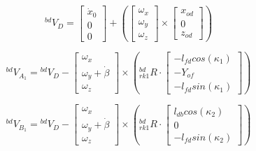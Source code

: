 \begin{equation}\label{traction_control:discussion:velocity-body}
	{}^{bd}V_{D} = \left[\begin{array}{c}
		\dot{x}_0 \\
		0 \\
		0
	\end{array}\right] + \left(\left[\begin{array}{c}
		\omega_{x} \\
		\omega_{y} \\
		\omega_{z}
	\end{array}\right] \times \left[\begin{array}{c}
	x_{od} \\
	0 \\
	z_{od}
	\end{array}\right]\right)
\end{equation}

\begin{equation}\label{traction_control:discussion:velocity-rocker-wheel}
	{}^{bd}V_{A_{1}} = {}^{bd}V_{D} - \left[\begin{array}{c}
		\omega_{x} \\
		\omega_{y} + \dot{\beta} \\
		\omega_{z}
	\end{array}\right] \times \left({}^{bd}_{rk1}R \cdot \left[\begin{array}{c}
		-l_{fd} cos(\kappa_{1}) \\
		-Y_{of} \\
		-l_{fd} sin(\kappa_{1})
	\end{array}\right]\right)
\end{equation}

\begin{equation}\label{traction_control:discussion:velocity-bogie}
	{}^{bd}V_{B_{1}} = {}^{bd}V_{D} - \left[\begin{array}{c}
		\omega_{x} \\
		\omega_{y} + \dot{\beta} \\
		\omega_{z}
	\end{array}\right] \times \left({}^{bd}_{rk1}R \cdot \left[\begin{array}{c}
		l_{db} cos(\kappa_{2}) \\
		0 \\
		-l_{fd} sin(\kappa_{2})
	\end{array}\right]\right)
\end{equation}

